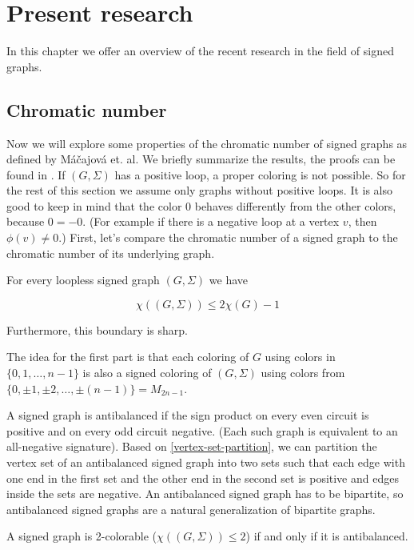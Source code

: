 \chapter{Present research}\label{present-research}

In this chapter we offer an overview of the recent research in the field of signed graphs. 

\section{Chromatic number}

Now we will explore some properties of the chromatic number of signed graphs as defined by Máčajová et. al. We briefly summarize the results, the proofs can be found in \cite{chromatic-number}.
If $(G, \Sigma)$ has a positive loop, a proper coloring is not possible. So for the rest of this section we assume
only graphs without positive loops. It is also good to keep in mind that the color $0$ behaves differently from the other colors, because $0 = -0$. 
(For example if there is a negative loop at a vertex $v$, then $\phi (v) \neq 0$.)
First, let's compare the chromatic number of a signed graph to the chromatic number of its underlying graph.

\begin{theorem}[Máčajová et. al.]
    For every loopless signed graph $(G, \Sigma)$ we have

    $$\chi ((G, \Sigma)) \leq 2 \chi (G) - 1$$

    Furthermore, this boundary is sharp.
\end{theorem}

The idea for the first part is that each coloring of $G$ using colors in $\{0, 1, \dots, n-1\}$
is also a signed coloring of $(G, \Sigma)$ using colors from $\{0, \pm 1, \pm 2, \dots, \pm (n-1)\} = M_{2n-1}$.

A signed graph is antibalanced if the sign product on every even circuit is positive and on every odd circuit negative.
(Each such graph is equivalent to an all-negative signature). Based on \cref{vertex-set-partition}, we can partition the 
vertex set of an antibalanced signed graph into two sets such that each edge with one end in the first set and the other end in the second set is positive and edges inside the sets are negative.
An antibalanced signed graph has to be bipartite, so antibalanced signed graphs are a natural generalization of bipartite graphs.

\begin{proposition}[Máčajová et. al.]
    A signed graph is 2-colorable ($\chi ((G, \Sigma)) \leq 2$) if and only if it is antibalanced.
\end{proposition}


